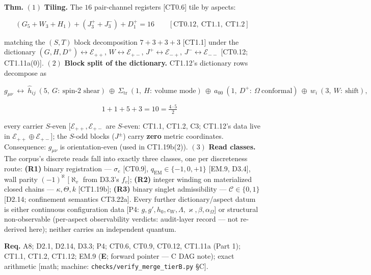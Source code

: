 \begin{theorem}\label{tag:CT1-12a}
\textbf{Thm.} $(1)$ \textbf{Tiling.} The $16$ pair-channel registers [CT0.6] tile by aspects:

\[
(G_5+W_3+H_1)+(J^+_3+J^-_3)+D^+_1=16\qquad[\mathrm{CT0.12},\ \mathrm{CT1.1},\ \mathrm{CT1.2}]
\]

matching the $(S,T)$ block decomposition $7+3+3+3$ [CT1.1] under the dictionary $(G,H,D^+)\leftrightarrow\mathcal E_{++}$, $W\leftrightarrow\mathcal E_{+-}$, $J^+\leftrightarrow\mathcal E_{-+}$, $J^-\leftrightarrow\mathcal E_{--}$ [CT0.12; CT1.11a(0)]. $(2)$ \textbf{Block split of the dictionary.} CT1.12's dictionary rows decompose as

\[
g_{\mu\nu}\ \leftrightarrow\ \hat h_{ij}\ (5,\ G:\ \text{spin-2 shear})\ \oplus\ \Sigma_{\mathrm{tr}}\ (1,\ H:\ \text{volume mode})\ \oplus\ a_{00}\ (1,\ D^+:\ \Omega\ \text{conformal})\ \oplus\ w_i\ (3,\ W:\ \text{shift}),
\]

\[
\qquad 1+1+5+3=10=\tfrac{4\cdot5}{2}
\]

every carrier $S$-even [$\mathcal E_{++},\mathcal E_{+-}$ are $S$-even: CT1.1, CT1.2, C3; CT1.12's data live in $\mathcal E_{++}\oplus\mathcal E_{+-}$]; the $S$-odd blocks ($J^\pm$) carry \textbf{zero} metric coordinates. Consequence: $g_{\mu\nu}$ is orientation-even (used in CT1.19b(2)). $(3)$ \textbf{Read classes.} The corpus's discrete reads fall into exactly three classes, one per discreteness route: \textbf{(R1)} binary registration — $\sigma_e$ [CT0.9], $q_{\mathrm{EM}}\in\{-1,0,+1\}$ [EM.9, D3.4], wall parity $(-1)^{\aleph}$ [$\aleph_v$ from D3.3's $f_v$]; \textbf{(R2)} integer winding on materialized closed chains — $\kappa,\Theta,k$ [CT1.19b]; \textbf{(R3)} binary singlet admissibility — $\mathcal C\in\{0,1\}$ [D2.14; confinement semantics CT3.22a]. Every further dictionary/aspect datum is either continuous configuration data [P4: $g,g',h_0,c_W,\Lambda,\varkappa,\beta,\alpha_\Omega$] or structural non-observable (per-aspect observability verdicts: audit-layer record — not re-derived here); neither carries an independent quantum.

\textbf{Req.} A8; D2.1, D2.14, D3.3; P4; CT0.6, CT0.9, CT0.12, CT1.11a (Part 1); CT1.1, CT1.2, CT1.12; EM.9 (\textbf{E}; forward pointer — C DAG note); exact arithmetic [math; machine: \texttt{checks/\allowbreak{}verify\_\allowbreak{}merge\_\allowbreak{}tierB.py} §C].


\end{theorem}
